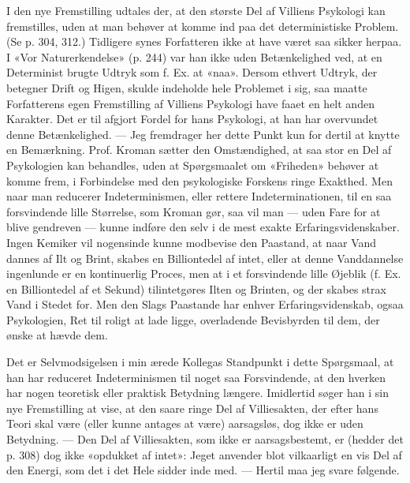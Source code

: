 \documentclass[12pt,a4paper,openany]{book}
\newcommand{\opage}[1]{\marginnote{\footnotesize\textit{[#1]}}}
\begin{document}
I den nye Fremstilling udtales der, at den største Del af Villiens Psykologi
kan fremstilles, uden at man behøver at komme ind paa det deterministiske
Problem. (Se p. 304, 312.) Tidligere synes Forfatteren ikke at have været saa
sikker herpaa. I «Vor Naturerkendelse» (p. 244) var han ikke uden Betænkelighed
ved, at en Determinist brugte Udtryk som f. Ex. at «naa». Dersom ethvert
Udtryk, der betegner Drift og Higen, skulde indeholde hele Problemet i sig, saa
maatte Forfatterens egen Fremstilling af Villiens Psykologi have faaet en helt
anden Karakter. Det er til afgjort Fordel for hans Psykologi, at han har
overvundet denne Betænkelighed. --- Jeg fremdrager her dette Punkt kun for
dertil at knytte en Bemærkning. Prof. Kroman sætter den Omstændighed, at saa
stor en Del af Psykologien kan behandles, uden at Spørgsmaalet om «Friheden»
behøver at komme frem, i Forbindelse med den psykologiske Forskens ringe
Exakthed. Men naar man reducerer Indeterminismen, eller rettere
Indeterminationen, til en saa forsvindende lille Størrelse, som Kroman gør, saa
vil man --- uden Fare for at blive gendreven --- kunne indføre den selv i de
mest exakte Erfaringsvidenskaber. Ingen Kemiker vil nogensinde kunne modbevise
den Paastand, at naar Vand dannes af Ilt og Brint, skabes en Billiontedel af
intet, eller at denne Vanddannelse ingenlunde er en kontinuerlig Proces, men at
i et forsvindende lille Øjeblik (f. Ex. en Billiontedel af et Sekund)
tilintetgøres Ilten og Brinten, og der skabes strax Vand i Stedet for. Men den
Slags Paastande har enhver Erfaringsvidenskab, ogsaa Psykologien, Ret til
roligt at lade ligge, overladende Bevisbyrden til dem, der ønske at hævde dem.

\setcounter{footnote}{0}%
\opage{101}Det er Selvmodsigelsen i min ærede Kollegas Standpunkt i dette
Spørgsmaal, at han har reduceret Indeterminismen til noget saa Forsvindende, at
den hverken har nogen teoretisk eller praktisk Betydning længere. Imidlertid
søger han i sin nye Fremstilling at vise, at den saare ringe Del af
Villiesakten, der efter hans Teori skal være (eller kunne antages at være)
aarsagsløs, dog ikke er uden Betydning. --- Den Del af Villiesakten, som ikke
er aarsagsbestemt, er (hedder det p. 308) dog ikke «opdukket af intet»: Jeget
anvender blot vilkaarligt en vis Del af den Energi, som det i det Hele sidder
inde med. --- Hertil maa jeg svare følgende.
\end{document}
